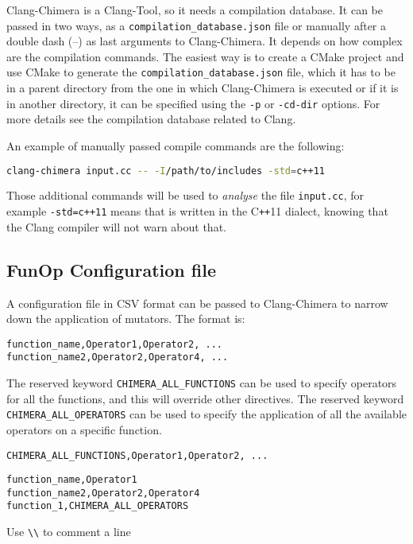 \documentclass[10pt,a4paper]{article}
\begin{document}
Clang-Chimera is a Clang-Tool, so it needs a compilation database.
It can be passed in two ways, as a \texttt{compilation\_database.json} file or manually after a double dash (--) as last arguments to Clang-Chimera. It depends on how complex are the compilation commands. The easiest way is to create a CMake project and use CMake to generate the \texttt{compilation\_database.json} file, which it has to be in a parent directory from the one in which Clang-Chimera is executed or if it is in another directory, it can be specified using the \texttt{-p} or \texttt{-cd-dir} options. For more details see the compilation database related to Clang.

An example of manually passed compile commands are the following:
\begin{lstlisting}[language=bash]
clang-chimera input.cc -- -I/path/to/includes -std=c++11
\end{lstlisting}

Those additional commands will be used to \textit{analyse} the file \texttt{input.cc}, for example \texttt{-std=c++11} means that is written in the C\texttt{++}11 dialect, knowing that the Clang compiler will not warn about that.

\subsection{FunOp Configuration file}
A configuration file in CSV format can be passed to Clang-Chimera to narrow down the application of mutators. The format is:
\begin{lstlisting}
function_name,Operator1,Operator2, ...
function_name2,Operator2,Operator4, ...
\end{lstlisting}

The reserved keyword \texttt{CHIMERA\_ALL\_FUNCTIONS} can be used to specify operators for all the functions, and this will override other directives. The reserved keyword \texttt{CHIMERA\_ALL\_OPERATORS} can be used to specify the application of all the available operators on a specific function.

\begin{lstlisting}
CHIMERA_ALL_FUNCTIONS,Operator1,Operator2, ...
\end{lstlisting}
\begin{lstlisting}
function_name,Operator1
function_name2,Operator2,Operator4
function_1,CHIMERA_ALL_OPERATORS
\end{lstlisting}

Use \texttt{\textbackslash\textbackslash} to comment a line
\end{document}
